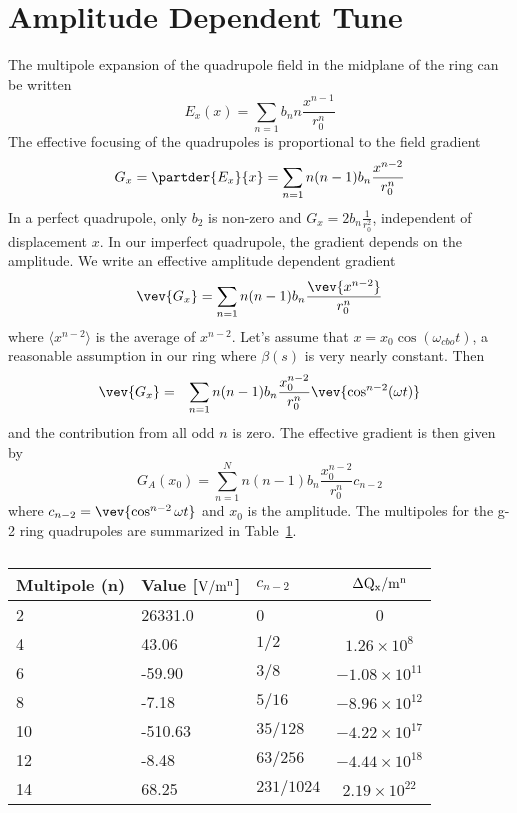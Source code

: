 \documentclass[10pt]{report}
\begin{document}
\section*{Amplitude Dependent Tune}
The multipole expansion of the quadrupole field in the midplane of the ring can be written\cite{NIMesquad}
$$E_x(x) = \sum_{n=1} b_n n\frac{x^{n-1}}{r_0^n}$$
The effective focusing of the quadrupoles is proportional to the field gradient
$$G_x = \partder{E_x}{x}=\sum_{n=1} n(n-1) b_n \frac{x^{n-2}}{r_0^n}$$
In a perfect quadrupole, only $b_2$ is non-zero and $G_x = 2b_n\frac{1}{r_0^2}$, independent of displacement $x$. 
In our imperfect quadrupole,
the gradient depends on the amplitude. We write an effective amplitude dependent gradient 
$$\vev{G_x} = \sum_{n=1} n(n-1) b_n \frac{\vev{x^{n-2}}}{r_0^n}$$
where $\langle x^{n-2}\rangle$ is the average of $x^{n-2}$.
Let's assume that $x =x_0\cos(\omega_{cbo} t)$, a reasonable assumption in our ring where $\beta(s)$ is very nearly constant. Then     
\begin{eqnarray}
\vev{G_x} &=& \sum_{n=1} n(n-1) b_n \frac{x_0^{n-2}}{r_0^n}\vev{\cos^{n-2}(\omega t)}\label{gradient}\\
\end{eqnarray}
and the contribution from all odd $n$ is zero.
The effective gradient is then given by
$${G_A(x_0)} = \sum_{n=1}^N n(n-1) b_{n} \frac{x_0^{n-2}}{r_0^{n}}c_{n-2}$$
where $c_{n-2} = \vev{\cos^{n-2}\omega t}$ and $x_0$ is the amplitude.
The multipoles for the g-2 ring quadrupoles are summarized in Table~\ref{quadparams}.
\begin{table}[b]
\caption{}
\begin{center}
\begin{tabular}{|l|l|l|c|}
\hline
Multipole (n) & Value [${\rm V/m^n}$]&$c_{n-2}$& $\Delta {\rm Q_x/m^n}$\\ \hline
2&26331.0 &0& 0 \\
4&43.06 & $1/2$&$1.26\times 10^{8}$\\
6& -59.90&${3}/{8}$&$-1.08\times 10^{11}$\\
8& -7.18&${5}/{16}$&$-8.96\times 10^{12}$\\
10& -510.63&${35}/{128}$&$-4.22\times 10^{17}$\\
12& -8.48&${63}/{256}$&$-4.44\times 10^{18}$\\
14& 68.25&$231/1024$&$2.19\times 10^{22}$\\
\hline
\end{tabular}
\end{center}
\label{quadparams}
\end{table}
\end{document}

